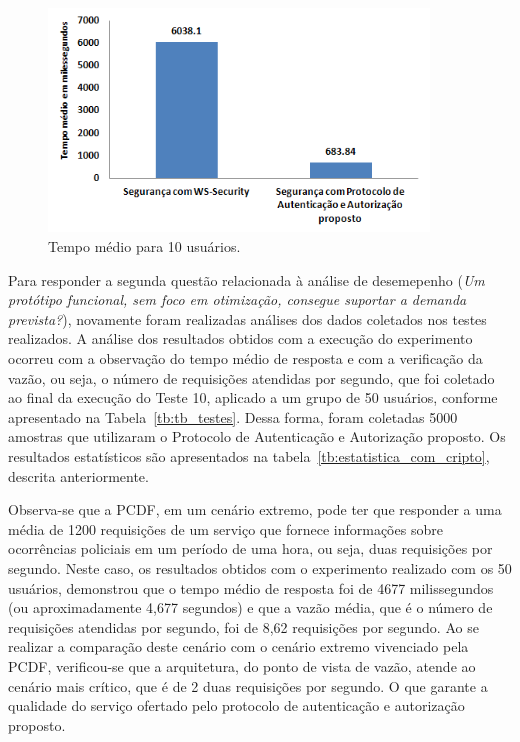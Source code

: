 \begin{figure}[!htb]
    \centering
    \includegraphics[width=0.9\textwidth]{comparativowssecurity.png}
    \caption{Tempo médio para 10 usuários.}
    \label{fig:comparativowssecurity}
\end{figure}


Para responder a segunda questão relacionada \`{a} an\'{a}lise de desemepenho (\emph{Um protótipo funcional, sem foco em otimização, consegue suportar a demanda prevista?}), novamente foram realizadas análises dos dados coletados nos testes realizados. A análise dos resultados obtidos com a execução do experimento ocorreu com a observação do tempo médio de resposta e com a verificação da vazão, ou seja, o número de requisições atendidas por segundo, que foi coletado ao final da execução do Teste 10, aplicado a um grupo de 50 usuários, conforme apresentado na Tabela~\ref{tb:tb_testes}. Dessa forma, foram coletadas 5000 amostras que utilizaram o Protocolo de Autenticação e Autorização proposto. Os resultados estatísticos são apresentados na tabela~\ref{tb:estatistica_com_cripto}, descrita anteriormente.

Observa-se que a PCDF, em um cenário extremo, pode ter que responder a uma média de 1200 requisições de um serviço que fornece informações sobre ocorrências policiais em um período de uma hora, ou seja, duas requisições por segundo. Neste caso, os resultados obtidos com o experimento realizado com os 50 usuários, demonstrou que o tempo médio de resposta foi de 4677 milissegundos (ou aproximadamente 4,677 segundos) e que a vazão média, que é o número de requisições atendidas por segundo, foi de 8,62 requisições por segundo. Ao se realizar a comparação deste cenário com o cenário extremo vivenciado pela PCDF, verificou-se que a arquitetura, do ponto de vista de vazão, atende ao cen\'{a}rio mais cr\'{i}tico, que é de 2 duas requisições por segundo. O que garante a qualidade do serviço ofertado pelo protocolo de autenticação e autorização proposto.

